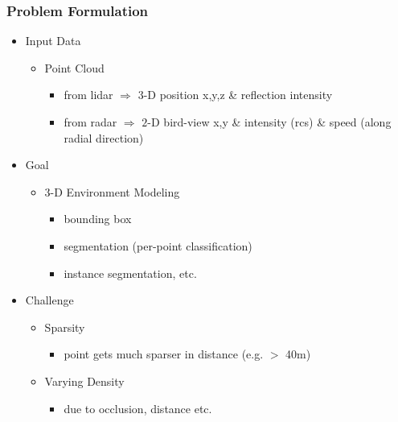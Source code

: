 \subsubsection{Problem Formulation}
\begin{itemize}
\item Input Data
	\begin{itemize}
	\item Point Cloud
		\begin{itemize}
		\item from lidar $\Rightarrow$ $3$-D position x,y,z \& reflection intensity
		\item from radar $\Rightarrow$ $2$-D bird-view x,y \& intensity (rcs) \& speed (along radial direction)
		\end{itemize}
	\end{itemize}
\item Goal
	\begin{itemize}
	\item $3$-D Environment Modeling
		\begin{itemize}
		\item bounding box
		\item segmentation (per-point classification)
		\item instance segmentation, etc.
		\end{itemize}
	\end{itemize}
\item Challenge
	\begin{itemize}
	\item Sparsity
		\begin{itemize}
		\item point gets much sparser in distance (e.g. $>$ 40m)
		\end{itemize}
	\item Varying Density
		\begin{itemize}
		\item due to occlusion, distance etc.
		\end{itemize}
	\end{itemize}
\end{itemize}
